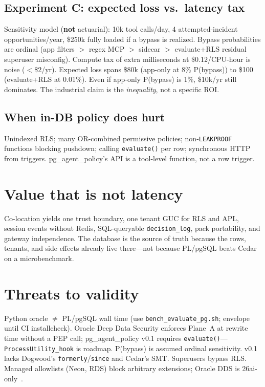 \documentclass[sigconf,review]{acmart}
\begin{document}
\subsection{Experiment C: expected loss vs.\ latency tax}

Sensitivity model (\textbf{not} actuarial): 10k tool calls/day, 4 attempted-incident opportunities/year, \$250k fully loaded if a bypass is realized. Bypass probabilities are ordinal (app filters $>$ regex MCP $>$ sidecar $>$ evaluate+RLS residual superuser misconfig). Compute tax of extra milliseconds at \$0.12/CPU-hour is noise ($<$\$2/yr). Expected loss spans \$80k (app-only at 8\% P(bypass)) to \$100 (evaluate+RLS at 0.01\%). Even if app-only P(bypass) is 1\%, \$10k/yr still dominates. The industrial claim is the \emph{inequality}, not a specific ROI.

\subsection{When in-DB policy does hurt}

Unindexed RLS; many OR-combined permissive policies; non-\texttt{LEAKPROOF} functions blocking pushdown; calling \texttt{evaluate()} per row; synchronous HTTP from triggers. pg\_agent\_policy's API is a tool-level function, not a row trigger.

\section{Value that is not latency}

Co-location yields one trust boundary, one tenant GUC for RLS and APL, session events without Redis, SQL-queryable \texttt{decision\_log}, pack portability, and gateway independence. The database is the source of truth because the rows, tenants, and side effects already live there---not because PL/pgSQL beats Cedar on a microbenchmark.

\section{Threats to validity}

Python oracle $\neq$ PL/pgSQL wall time (use \texttt{bench\_evaluate\_pg.sh}; envelope until CI installcheck). Oracle Deep Data Security enforces Plane~A at rewrite time without a PEP call; pg\_agent\_policy v0.1 requires \texttt{evaluate()}---\texttt{ProcessUtility\_hook} is roadmap. P(bypass) is assumed ordinal sensitivity. v0.1 lacks Dogwood's \texttt{formerly}/\texttt{since} and Cedar's SMT. Superusers bypass RLS. Managed allowlists (Neon, RDS) block arbitrary extensions; Oracle DDS is 26ai-only~\cite{pgxn}.
\end{document}
